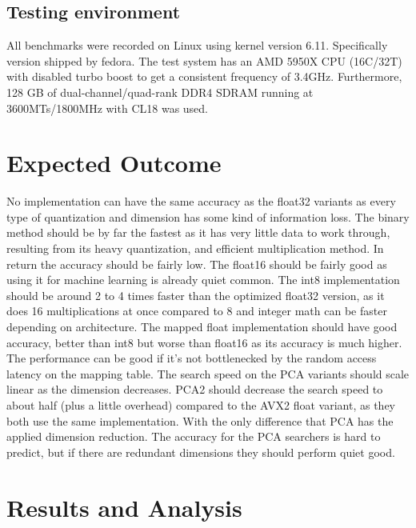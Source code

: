\subsection{Testing environment}
All benchmarks were recorded on Linux using kernel version 6.11. Specifically version \texttt{} shipped by fedora.
The test system has an AMD 5950X CPU (16C/32T) with disabled turbo boost to get a consistent frequency of 3.4GHz.
Furthermore, 128 GB of dual-channel/quad-rank DDR4 SDRAM running at 3600MTs/1800MHz with CL18 was used.

\section{Expected Outcome}
No implementation can have the same accuracy as the float32 variants as every type of quantization and dimension has some kind of information loss.
The binary method should be by far the fastest as it has very little data to work through, resulting from its heavy quantization, and efficient multiplication method. In return the accuracy should be fairly low. The float16 should be fairly good as using it for machine learning is already quiet common.
The int8 implementation should be around 2 to 4 times faster than the optimized float32 version, as it does 16 multiplications at once compared to 8 and integer math can be faster depending on architecture. The mapped float implementation should have good accuracy, better than int8 but worse than float16 as its accuracy is much higher. The performance can be good if it's not bottlenecked by the random access latency on the mapping table.
The search speed on the PCA variants should scale linear as the dimension decreases. PCA2 should decrease the search speed to about half (plus a little overhead) compared to the AVX2 float variant, as they both use the same implementation. With the only difference that PCA has the applied dimension reduction. The accuracy for the PCA searchers is hard to predict, but if there are redundant dimensions they should perform quiet good.

\section{Results and Analysis}
